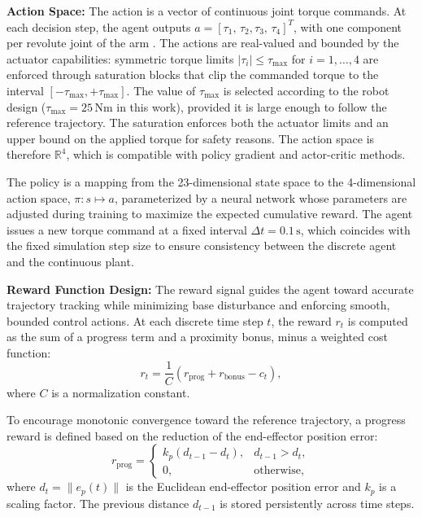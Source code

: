 \documentclass{ieeeaccess}
\begin{document}
\textbf{Action Space:} The action is a vector of continuous joint torque commands.
At each decision step, the agent outputs $a = [\tau_{1},\, \tau_{2}, \tau_{3},\, \tau_{4}]^T$, with one component per revolute joint of the arm \cite{b2,b7}. The actions are real-valued and bounded by the actuator capabilities: symmetric torque limits $|\tau_{i}| \leq \tau_{\max}$ for $i = 1,\ldots,4$ are enforced through saturation blocks that clip the commanded torque to the interval $[-\tau_{\max}, +\tau_{\max}]$. The value of $\tau_{\max}$ is selected according to the robot design ($\tau_{\max} = 25\,\mathrm{Nm}$ in this work), provided it is large enough to follow the reference trajectory. The saturation enforces both the actuator limits and an upper bound on the applied torque for safety reasons. The action space is therefore $\mathbb{R}^4$, which is compatible with policy gradient and actor-critic methods.

The policy is a mapping from the 23-dimensional state space to
the 4-dimensional action space, $\pi: s \mapsto a$, parameterized by a neural network whose parameters are adjusted during training to maximize the expected cumulative reward.
The agent issues a new torque command at a fixed interval $\Delta t = 0.1\,\mathrm{s}$, which coincides with the fixed simulation step size to ensure consistency between the discrete agent and the continuous plant.


\noindent
\textbf{Reward Function Design:} The reward signal guides the agent toward accurate trajectory tracking
while minimizing base disturbance and enforcing smooth, bounded control actions.
At each discrete time step $t$, the reward $r_t$ is computed as the sum of a progress term and a proximity bonus, minus a weighted cost function:
\begin{equation}
r_t = \frac{1}{C}\left( r_{\text{prog}} + r_{\text{bonus}} - c_t \right),
\label{eq:reward}
\end{equation}
where $C$ is a normalization constant.

To encourage monotonic convergence toward the reference trajectory, a progress reward is defined based on the reduction of the end-effector position error:
\begin{equation}
r_{\text{prog}} = 
\begin{cases}
k_p \left( d_{t-1} - d_t \right), & d_{t-1} > d_t,\\
0, & \text{otherwise},
\end{cases}
\end{equation}
where $d_t = \|e_p(t)\|$ is the Euclidean end-effector position error and $k_p$ is a scaling factor. The previous distance $d_{t-1}$ is stored persistently across time steps.
\end{document}
